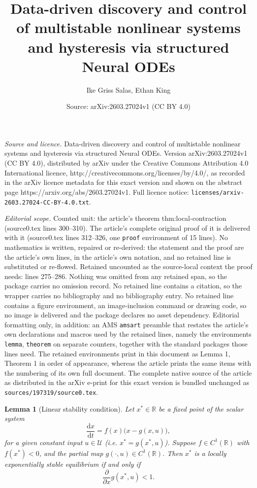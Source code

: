 \documentclass[10pt,a4paper]{amsart}
\title{Data-driven discovery and control of multistable nonlinear systems and hysteresis via structured Neural ODEs}
\author{Ike Griss Salas, Ethan King}
\date{Source: arXiv:2603.27024v1 (CC BY 4.0)}
\newtheorem{lemma}{Lemma}
\newcommand{\R}{\mathbb{R}}
\begin{document}
\maketitle

\noindent\emph{Source and licence.} Data-driven discovery and control of multistable nonlinear systems and hysteresis via structured Neural ODEs. Version arXiv:2603.27024v1 (CC BY 4.0), distributed by arXiv under the Creative Commons Attribution 4.0 International licence, http://creativecommons.org/licenses/by/4.0/, as recorded in the arXiv licence metadata for this exact version and shown on the abstract page https://arxiv.org/abs/2603.27024v1. Full licence notice: \texttt{licenses/arxiv-2603.27024-CC-BY-4.0.txt}.\par\smallskip

\noindent\textit{Editorial scope.} Counted unit: the article's theorem thm:local-contraction (source0.tex lines 300--310). The article's complete original proof of it is delivered with it (source0.tex lines 312--326, one \texttt{proof} environment of 15 lines). No mathematics is written, repaired or re-derived: the statement and the proof are the article's own lines, in the article's own notation, and no retained line is substituted or re-flowed.  Retained uncounted as the source-local context the proof needs: lines 275--286.  Nothing was omitted from any retained span, so the package carries no omission record.  No retained line contains a citation, so the wrapper carries no bibliography and no bibliography entry.  No retained line contains a figure environment, an image-inclusion command or drawing code, so no image is delivered and the package declares no asset dependency.  Editorial formatting only, in addition: an AMS \texttt{amsart} preamble that restates the article's own declarations and macros used by the retained lines, namely the environments \texttt{lemma}, \texttt{theorem} on separate counters, together with the standard packages those lines need.  The retained environments print in this document as Lemma 1, Theorem 1 in order of appearance, whereas the article prints the same items with the numbering of its own full document.  The complete native source of the article as distributed in the arXiv e-print for this exact version is bundled unchanged as \texttt{sources/197319/source0.tex}.
\begin{lemma}[Linear stability condition]\label{lem:linear-stability}
Let \(x^* \in \R\) be a fixed point of the scalar system
\[
    \frac{\mathrm{d}x}{\mathrm{d}t} = f(x)\bigl(x - g(x,u)\bigr),
\]
for a given constant input \(u \in \mathcal{U}\) (i.e. \(x^* = g(x^*,u)\)). Suppose \(f\in C^1(\R)\)  with \(f(x^*)<0\), and 
the partial map \(g(\cdot, u) \in C^1(\R)\).  
Then \(x^*\) is a locally exponentially stable equilibrium if and only if
\[
    \frac{\partial}{\partial x} g(x^*,u) < 1.
\]
\end{lemma}
\end{document}
